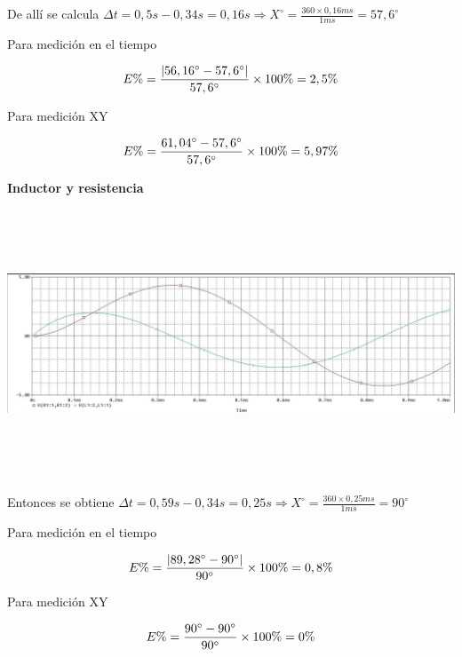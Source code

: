 \documentclass[12pt]{article}
\begin{document}
\begin{enumerate}
		\noindent De allí se calcula $\Delta t = 0,5s - 0,34s = 0,16s\Rightarrow X^\circ = \frac{360 \times 0,16ms}{1ms} = 57,6^\circ$
		
		\noindent Para medición en el tiempo
		
		\begin{equation}
			\notag E\% = \frac{|56,16^\circ - 57,6^\circ|}{57,6^\circ}\times 100\% = 2,5\%
		\end{equation}
		
		\noindent Para medición XY
		
		\begin{equation}
			\notag E\% = \frac{61,04^\circ - 57,6^\circ}{57,6^\circ}\times 100\% = 5,97\%
		\end{equation}
	
		\noindent \textbf{Inductor y resistencia}
		
		\begin{center}
			\includegraphics[width=16cm,height=8cm]{Img/spice_lvresist}
		\end{center}
	
		\noindent Entonces se obtiene $\Delta t = 0,59s - 0,34s = 0,25s\Rightarrow X^\circ = \frac{360 \times 0,25ms}{1ms} = 90^\circ$
		
		\noindent Para medición en el tiempo
		
		\begin{equation}
			\notag E\% = \frac{|89,28^\circ - 90^\circ|}{90^\circ}\times 100\% = 0,8\%
		\end{equation}
		
		\noindent Para medición XY
		
		\begin{equation}
			\notag E\% = \frac{90^\circ - 90^\circ}{90^\circ}\times 100\% = 0\%
		\end{equation}
	

\end{enumerate}
\end{document}
